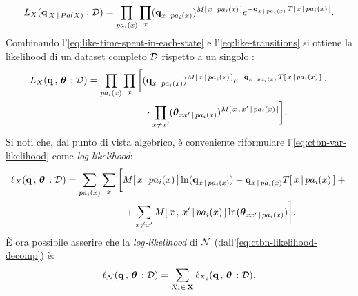 \footnotesize
\begin{equation}\label{eq:like-time-spent-in-each-state}
L_{\setel{X}}(\param{q}_{\,\setel{X}\,\arrowvert\,Pa(\setel{X})}:\conceptsym{D})=\prod_{pa_i(\setel{x})}\prod_{x}(\param{q}_{x\,\arrowvert\,pa_i(\setel{x})})^{\mstat{x\,\arrowvert\,pa_i(\setel{x})}}e^{-\param{q}_{\setel{x}\,\arrowvert\,pa_i(\setel{x})}\,\tstat{\setel{x}\,\arrowvert\,pa_i(\setel{x})}}\text{\normalsize .}\vspace{1mm}
\end{equation}
\normalsize
Combinando l'\autoref{eq:like-time-spent-in-each-state} e l'\autoref{eq:like-transitions} si ottiene la likelihood di un dataset completo $\mathcal{D}$ rispetto a un singolo \mprocess*{} \cond*{}:
\footnotesize
\begin{align}\label{eq:ctbn-var-likelihood}
L_{\setel{X}}(\param{q}\,,\,\param{$\theta$}\,:\conceptsym{D}) &= \prod_{pa_i(\setel{x})}\prod_{\setel{x}} \bigg[ (\param{q}_{\setel{x}\,\arrowvert\,pa_i(\setel{x})})^{\mstat{x\,\arrowvert\,pa_i(\setel{x})}}e^{-\param{q}_{\setel{x}\,\arrowvert\,pa_i(\setel{x})}\,\tstat{x\,\arrowvert\,pa_i(\setel{x})}} \cdot \bigg.\nonumber\\
& \qquad \bigg.{} \qquad \qquad \cdot \prod_{\setel{x}\neq \setel{x}^{\prime}}(\param{$\theta$}_{\setel{x}\setel{x}^{\prime}\,\arrowvert\,pa_i(\setel{x})})^{\mstat[x]{\setel{x}^{\prime}\,\arrowvert\,pa_i(\setel{x})}} \bigg] \text{\normalsize .}
\end{align}
\normalsize
Si noti che, dal punto di vista algebrico, è conveniente riformulare l'\autoref{eq:ctbn-var-likelihood} come \emph{log-likelihood}:
\footnotesize
\begin{align}\label{eq:ctbn-var-log-likelihood}
\ell_{\setel{X}}(\param{q}\,,\,\param{$\theta$}\,:\conceptsym{D}) &= \sum_{pa_i(\setel{x})}\sum_{\setel{x}} \bigg[ \mstat{x\,\arrowvert\,pa_i(\setel{x})}\ln(\param{q}_{x\,\arrowvert\,pa_i(\setel{x})})- \param{q}_{\setel{x}\,\arrowvert\,pa_i(\setel{x})}\tstat{\setel{x}\,\arrowvert\,pa_i(\setel{x})} + \bigg.\nonumber\\
& \qquad \bigg.{} \qquad \qquad + \sum_{\setel{x}\neq \setel{x}^{\prime}}\mstat[x]{\setel{x}^{\prime}\,\arrowvert\,pa_i(\setel{x})}\ln(\param{$\theta$}_{\setel{x}\setel{x}^{\prime}\,\arrowvert\,pa_i(\setel{x})}) \bigg] \text{\normalsize .}
\end{align}
\normalsize
\`E ora possibile asserire che la \emph{log-likelihood} di $\mathcal{N}$ (dall'\autoref{eq:ctbn-likelihood-decomp}) è:
\begin{equation}\label{eq:ctbn-log-likelihood}
\ell_{\mathcal{N}}(\boldsymbol{\textbf{\text{q}}}\,,\,\boldsymbol{\textbf{\text{$\theta$}}}\,:\mathcal{D})=\sum_{\mathnormal{X}_i \in \, \mathbf{X}} \ell_{\mathnormal{X}_i}(\boldsymbol{\textbf{\text{q}}}\,,\,\boldsymbol{\textbf{\text{$\theta$}}}\,:\mathcal{D}) \text{.}
\end{equation}


